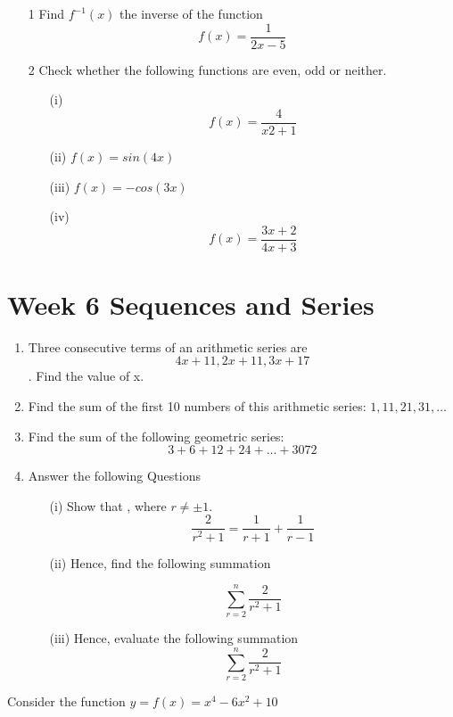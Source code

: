 \documentclass[]{article}
\begin{document}
\begin{itemize}
\item[1] Find $f^{-1}(x)$ the inverse of the function 
\[f(x) = \frac{1}{2x-5}\]
\item[2] Check whether the following functions are even, odd or neither.
\begin{itemize}
	\item[(i)] \[f(x) = \frac{4}{x2+1}\]
	\item[(ii)] $f(x) = sin(4x) $
	\item[(iii)] $f(x) = -cos(3x) $
	\item[(iv)] \[f(x) = \frac{3x+2}{4x+3} \]
\end{itemize}
\end{itemize}

\newpage
\section{Week 6 Sequences and Series}
\begin{enumerate}
\item Three consecutive terms of an arithmetic series are \[4x +11, 2x +11, 3x +17 \].
Find the value of x.
\item Find the sum of the first 10 numbers of this arithmetic series: $1, 11, 21, 31 , \ldots$

\item Find the sum of the following geometric series: 
\[3 + 6 + 12 + 24 + \ldots + 3072\]

\item  Answer the following Questions
\begin{itemize}
\item[(i)] Show that , where $r \neq \pm 1$.
\[ \frac{2}{r^2+1} =  \frac{1}{r+1} + \frac{1}{r-1} \]
\item[(ii)] Hence, find the following summation


\[  \sum^{n}_{r=2} \frac{2}{r^2+1} \]
\item[(iii)] Hence, evaluate the following summation
\[  \sum^{n}_{r=2} \frac{2}{r^2+1} \]
\end{itemize}

\end{enumerate}

Consider the function $ y = f(x) = x^4 - 6x^2 + 10$
\newpage
\end{document}
